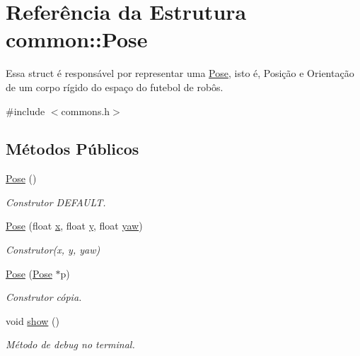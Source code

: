 \hypertarget{structcommon_1_1Pose}{}\section{Referência da Estrutura common\+:\+:Pose}
\label{structcommon_1_1Pose}


Essa struct é responsável por representar uma \hyperlink{structcommon_1_1Pose}{Pose}, isto é, Posição e Orientação de um corpo rígido do espaço do futebol de robôs.  




{\ttfamily \#include $<$commons.\+h$>$}

\subsection*{Métodos Públicos}
\begin{DoxyCompactItemize}
\item 
\hyperlink{structcommon_1_1Pose_ae8d335bc9fd48b9a28f75b29c0d87581}{Pose} ()\hypertarget{structcommon_1_1Pose_ae8d335bc9fd48b9a28f75b29c0d87581}{}\label{structcommon_1_1Pose_ae8d335bc9fd48b9a28f75b29c0d87581}

\begin{DoxyCompactList}\small\item\em Construtor D\+E\+F\+A\+U\+LT. \end{DoxyCompactList}\item 
\hyperlink{structcommon_1_1Pose_a13c5329282b42ce481d6c161117c708d}{Pose} (float \hyperlink{structcommon_1_1Pose_a4ea360bde6890187e0a8ce0ca57fa031}{x}, float \hyperlink{structcommon_1_1Pose_aa7debd220c3cb6f294253188045a4d0d}{y}, float \hyperlink{structcommon_1_1Pose_a6abb6006c34912516585beeb33077c6c}{yaw})\hypertarget{structcommon_1_1Pose_a13c5329282b42ce481d6c161117c708d}{}\label{structcommon_1_1Pose_a13c5329282b42ce481d6c161117c708d}

\begin{DoxyCompactList}\small\item\em Construtor(x, y, yaw) \end{DoxyCompactList}\item 
\hyperlink{structcommon_1_1Pose_a54bb645f2fa8043de902b6cfa0b7c90e}{Pose} (\hyperlink{structcommon_1_1Pose}{Pose} $\ast$p)\hypertarget{structcommon_1_1Pose_a54bb645f2fa8043de902b6cfa0b7c90e}{}\label{structcommon_1_1Pose_a54bb645f2fa8043de902b6cfa0b7c90e}

\begin{DoxyCompactList}\small\item\em Construtor cópia. \end{DoxyCompactList}\item 
void \hyperlink{structcommon_1_1Pose_a41bd06a4fc95fc1cdac527fab6ef4d21}{show} ()\hypertarget{structcommon_1_1Pose_a41bd06a4fc95fc1cdac527fab6ef4d21}{}\label{structcommon_1_1Pose_a41bd06a4fc95fc1cdac527fab6ef4d21}

\begin{DoxyCompactList}\small\item\em Método de debug no terminal. \end{DoxyCompactList}\end{DoxyCompactItemize}
